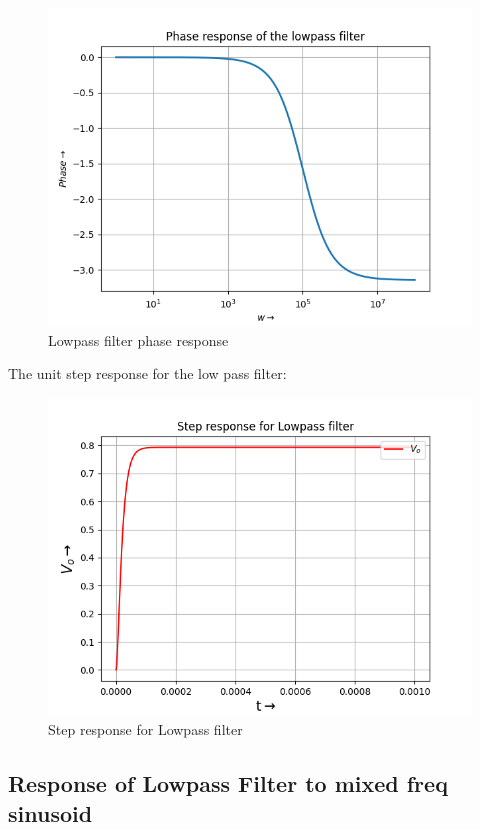 \documentclass{article}
\begin{document}
\begin{figure}[h!]
	\centering
	\includegraphics[scale=0.5]{Figure_2.png}
	\caption{Lowpass filter phase response}
	\label{fig:Lowpass filter phase response}
\end{figure}

\clearpage

The unit step response for the low pass filter:


\begin{figure}[h!]
	\centering
	\includegraphics[scale=0.55]{Figure_3}
	\caption{Step response for Lowpass filter}
	\label{fig:Step response for Lowpass filter}
\end{figure}


\subsection{Response of Lowpass Filter to mixed freq sinusoid}
\end{document}
